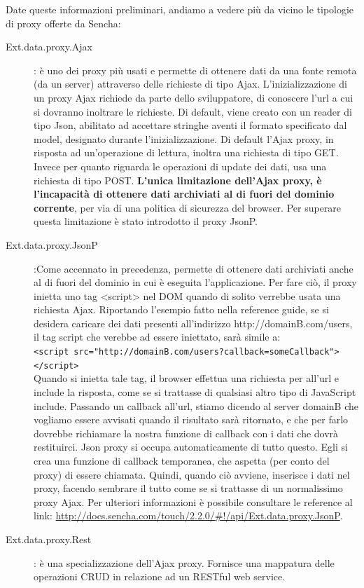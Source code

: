 \documentclass[10pt,a4paper,onecolumn]{article}
\begin{document}
Date queste informazioni preliminari, andiamo a vedere più da vicino le tipologie di proxy offerte da Sencha:

\begin{description}
	\item[Ext.data.proxy.Ajax]: è uno dei proxy più usati e permette di ottenere dati da una fonte remota (da un server) attraverso delle richieste di tipo Ajax. L'inizializzazione di un proxy Ajax richiede da parte dello sviluppatore, di conoscere l'url a cui si dovranno inoltrare le richieste. Di default, viene creato con un reader di tipo Json, abilitato ad accettare stringhe aventi il formato specificato dal model, designato durante l'inizializzazione. Di default l'Ajax proxy, in risposta ad un'operazione di lettura, inoltra una richiesta di tipo GET. Invece per quanto riguarda le operazioni di update dei dati, usa una richiesta di tipo POST. \textbf{L'unica limitazione dell'Ajax proxy, è l'incapacità di ottenere dati archiviati al di fuori del dominio corrente}, per via di una politica di sicurezza del browser. Per superare questa limitazione è stato introdotto il proxy JsonP.
	\item[Ext.data.proxy.JsonP]:Come accennato in precedenza, permette di ottenere dati archiviati anche al di fuori del dominio in cui è eseguita l'applicazione. Per fare ciò, il proxy inietta uno tag <script> nel DOM quando di solito verrebbe usata una richiesta Ajax. Riportando l'esempio fatto nella reference guide, se si desidera caricare dei dati presenti all'indirizzo http://domainB.com/users, il tag script che verebbe ad essere iniettato, sarà simile a:\\
	
	\verb|<script src="http://domainB.com/users?callback=someCallback"></script>|\\
	
	Quando si inietta tale tag, il browser effettua una richiesta per all'url e include la risposta, come se si trattasse di qualsiasi altro tipo di JavaScript include. Passando un callback all'url, stiamo dicendo al server domainB che vogliamo essere avvisati quando il risultato sarà ritornato, e che per farlo dovrebbe richiamare la nostra funzione di callback con i dati che dovrà restituirci. Json proxy si occupa automaticamente di tutto questo. Egli si crea una funzione di callback temporanea, che aspetta (per conto del proxy) di essere chiamata. Quindi, quando ciò avviene, inserisce i dati nel proxy, facendo sembrare il tutto come se si trattasse di un normalissimo proxy Ajax. Per ulteriori informazioni è possibile consultare le reference al link: \url{http://docs.sencha.com/touch/2.2.0/#!/api/Ext.data.proxy.JsonP}.
	\item[Ext.data.proxy.Rest]: è una specializzazione dell'Ajax proxy. Fornisce una mappatura delle operazioni CRUD in relazione ad un RESTful web service.
\end{description}
\end{document}
